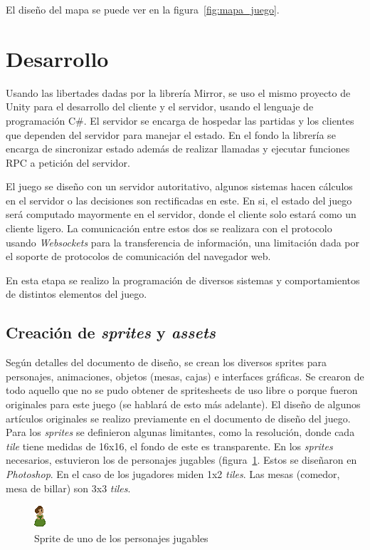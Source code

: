 El diseño del mapa se puede ver en la figura~\ref{fig:mapa_juego}.

\section{Desarrollo}
Usando las libertades dadas por la librería Mirror, se uso el mismo proyecto de Unity para el desarrollo del cliente y el servidor, usando el lenguaje de programación C\#. El servidor se encarga de hospedar las partidas y los clientes que dependen del servidor para manejar el estado. En el fondo la librería se encarga de  sincronizar estado además de realizar llamadas y ejecutar funciones RPC a petición del servidor.

El juego se diseño con un servidor autoritativo, algunos sistemas hacen cálculos en el servidor o las decisiones son rectificadas en este. En si, el estado del juego será computado mayormente en el servidor, donde el cliente solo estará como un cliente ligero. La comunicación entre estos dos se realizara con el protocolo usando \textit{Websockets} para la transferencia de información, una limitación dada por el soporte de protocolos de comunicación del navegador web.

En esta etapa se realizo la programación de diversos sistemas y comportamientos de distintos elementos del juego.

\subsection{Creación de \textit{sprites} y \textit{assets}}
Según detalles del documento de diseño, se crean los diversos sprites para personajes, animaciones, objetos (mesas, cajas) e interfaces gráficas. Se crearon de todo aquello que no se pudo obtener de spritesheets de uso libre o porque fueron originales para este juego (se hablará de esto más adelante). El diseño de algunos artículos originales se realizo previamente en el documento de diseño del juego. Para los \textit{sprites} se definieron algunas limitantes, como la resolución, donde cada \textit{tile}  tiene medidas de 16x16, el fondo de este es transparente. En los \textit{sprites} necesarios, estuvieron los de personajes jugables (figura~\ref{fig:sprite_johanna}. Estos se diseñaron en \textit{Photoshop}. En el caso de los jugadores miden 1x2 \textit{tiles}. Las mesas (comedor, mesa de billar) son 3x3 \textit{tiles}. 

\begin{figure}[h]
    \centering
    \includegraphics[width=0.2\linewidth]{images/JohannaOrdonez.png}
    \caption{Sprite de uno de los personajes jugables}
    \label{fig:sprite_johanna}
\end{figure}

